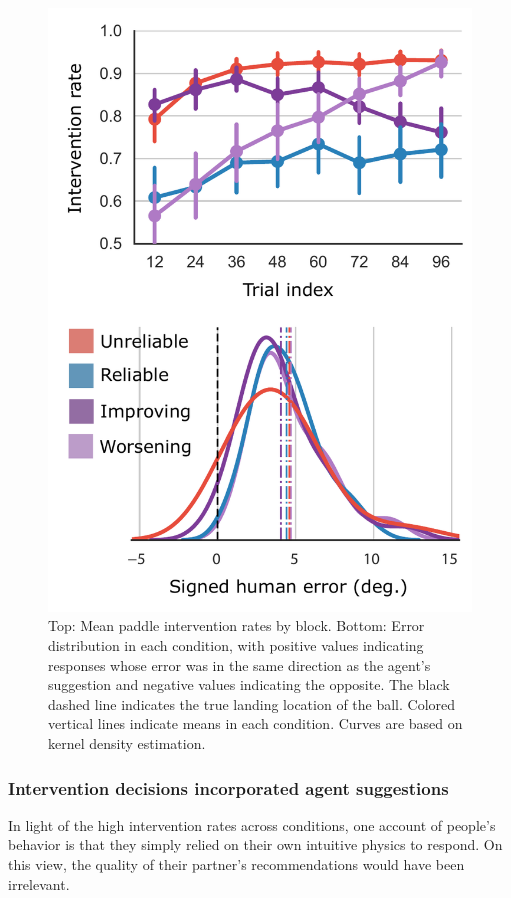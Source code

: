 \documentclass[10pt,letterpaper]{article}
\begin{document}
\begin{figure}[t]
\begin{center}
\includegraphics[width=0.9\linewidth]{img/error_interventions_combined.pdf}
\end{center}
\caption{
Top: Mean paddle intervention rates by block. 
Bottom: Error distribution in each condition, with positive values indicating responses whose error was in the same direction as the agent's suggestion and negative values indicating the opposite. The black dashed line indicates the true landing location of the ball. Colored vertical lines indicate means in each condition. Curves are based on kernel density estimation.}
\label{fig:interventions}
\end{figure}


\subsubsection{Intervention decisions incorporated agent suggestions}

In light of the high intervention rates across conditions, one account of people's behavior is that they simply relied on their own intuitive physics to respond. On this view, the quality of their partner's recommendations would have been irrelevant. 
\end{document}

